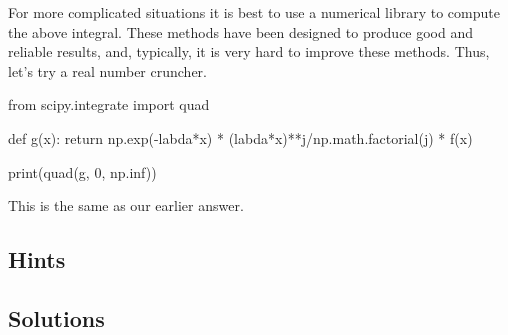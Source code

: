 \begin{exercise}
\begin{solution}
For more complicated situations it is best to use a
numerical library to compute the above integral. These methods have been
designed to produce good and reliable results, and, typically, it is
very hard to improve these methods. Thus, let's try a real number
cruncher.

\begin{pyconsole}
from scipy.integrate import quad

def g(x):
    return np.exp(-labda*x) * (labda*x)**j/np.math.factorial(j) * f(x)

print(quad(g, 0, np.inf))
\end{pyconsole}

This is the same as our earlier answer.
\end{solution}
\end{exercise}


\begin{comment}
\begin{exercise}[use=false]
  To analyze the distribution of $L$ of the $M/G/1$ we concentrated on
  the departure epochs. Why will this not help to find the
  distribution of $L$ for the $M/G/c$ queue?
  \begin{solution}
    \TBD.
  \end{solution}
\end{exercise}
\end{comment}


\subsection*{Hints}

\subsection*{Solutions}

\clearpage



